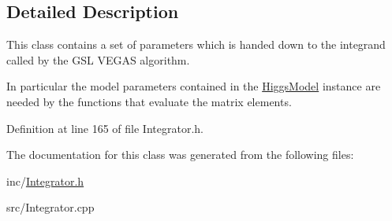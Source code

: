 \subsection{Detailed Description}
This class contains a set of parameters which is handed down to the integrand called by the G\+S\+L V\+E\+G\+A\+S algorithm. 

In particular the model parameters contained in the \hyperlink{classHiggsModel}{Higgs\+Model} instance are needed by the functions that evaluate the matrix elements. 

Definition at line 165 of file Integrator.\+h.



The documentation for this class was generated from the following files\+:\begin{DoxyCompactItemize}
\item 
inc/\hyperlink{Integrator_8h}{Integrator.\+h}\item 
src/Integrator.\+cpp\end{DoxyCompactItemize}

